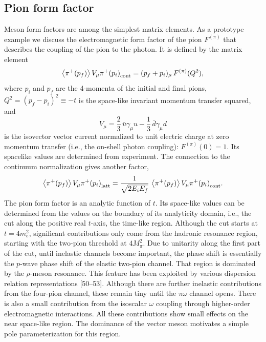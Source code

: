 \subsection{Pion form factor}
Meson form factors are among the simplest matrix elements. As a prototype
example we discuss the electromagnetic form factor of the pion $F^{(\pi)}$ that
describes the coupling of the pion to the photon. It is defined by the matrix
element
\begin{equation}
\left\langle \pi^+(p_f) \right\rangle{V_\mu}{\pi^+(p_i)}_{\mathrm{cont}} = (p_f + p_i)_\mu\, F^{(\pi)}(Q^2) ,
\end{equation}
where $p_i$ and $p_f$ are the 4-momenta of the initial and final pions, $Q^2 = (p_f -
p_i)^2 \equiv -t$ is the space-like invariant momentum transfer squared, and
\begin{equation}
V_\mu = \frac{2}{3}\,\bar{u}\gamma_\mu u - \frac{1}{3}\,\bar{d}\gamma_\mu d
\end{equation}
is the isovector vector current normalized to unit electric charge at zero momentum transfer (i.e., the on-shell photon coupling): $F^{(\pi)}(0) = 1$. Its spacelike values are determined from experiment.
The connection to the continuum normalization gives another factor,
\begin{equation}
\left\langle \pi^+(p_f) \right\rangle{V_\mu}{\pi^+(p_i)}_{\mathrm{latt}}
= \frac{1}{\sqrt{2E_iE_f}}\,
\left\langle \pi^+(p_f) \right\rangle{V_\mu}{\pi^+(p_i)}_{\mathrm{cont}} .
\end{equation}
The pion form factor is an analytic function of $t$. Its space-like values can be
determined from the values on the boundary of its analyticity domain, i.e., the
cut along the positive real $t$-axis, the time-like region. Although the cut starts
at $t = 4m_e^2$, significant contributions only come from the hadronic resonance
region, starting with the two-pion threshold at $4M_\pi^2$. Due to unitarity along
the first part of the cut, until inelastic channels become important, the phase
shift is essentially the $p$-wave phase shift of the elastic two-pion channel. That
region is dominated by the $\rho$-meson resonance. This feature has been exploited
by various dispersion relation representations [50--53].
Although there are further inelastic contributions from the four-pion channel, these remain tiny until the $\pi\omega$ channel opens. There is also a small contribution from the isoscalar $\omega$ coupling through higher-order electromagnetic
interactions. All these contributions show small effects on the near space-like
region. The dominance of the vector meson motivates a simple pole parameterization for this region.
